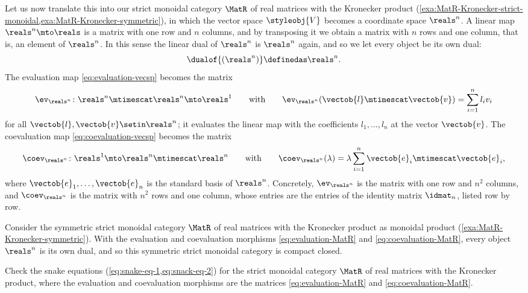 Let us now translate this into our strict monoidal category $\MatR$ of real matrices with the Kronecker product (\cref{exa:MatR-Kronecker-strict-monoidal,exa:MatR-Kronecker-symmetric}), in which the vector space $\styleobj{V}$ becomes a coordinate space $\reals^n$.
A linear map $\reals^n \mto \reals$ is a matrix with one row and $n$ columns, and by transposing it we obtain a matrix with $n$ rows and one column, that is, an element of $\reals^n$.
In this sense the linear dual of $\reals^n$ is $\reals^n$ again, and so we let every object be its own dual:
\begin{equation}
    \dualof{(\reals^n)} \definedas \reals^n.
\end{equation}
The evaluation map \cref{eq:evaluation-vecsp} becomes the matrix
\begin{equation}
    \label{eq:evaluation-MatR}
    \ev_{\reals^n} \colon \reals^n \mtimescat \reals^n \mto \reals^1
    \qquad \text{with} \qquad
    \ev_{\reals^n}(\vectob{l} \mtimescat \vectob{v}) = \sum_{i=1}^n l_i v_i
\end{equation}
for all $\vectob{l}, \vectob{v} \setin \reals^n$; it evaluates the linear map with the coefficients $l_1, \ldots, l_n$ at the vector $\vectob{v}$.
The coevaluation map \cref{eq:coevaluation-vecsp} becomes the matrix
\begin{equation}
    \label{eq:coevaluation-MatR}
    \coev_{\reals^n} \colon \reals^1 \mto \reals^n \mtimescat \reals^n
    \qquad \text{with} \qquad
    \coev_{\reals^n}(\lambda) = \lambda \sum_{i=1}^n \vectob{e}_i \mtimescat \vectob{e}_i,
\end{equation}
where $\vectob{e}_1, \ldots, \vectob{e}_n$ is the standard basis of $\reals^n$.
Concretely, $\ev_{\reals^n}$ is the matrix with one row and $n^2$ columns, and $\coev_{\reals^n}$ is the matrix with $n^2$ rows and one column, whose entries are the entries of the identity matrix $\idmat_n$, listed row by row.

\begin{proposition}
    \label{prop:MatR-Kronecker-compact-closed}
    Consider the symmetric strict monoidal category $\MatR$ of real matrices with the Kronecker product as monoidal product (\cref{exa:MatR-Kronecker-symmetric}).
    With the evaluation and coevaluation morphisms \cref{eq:evaluation-MatR} and \cref{eq:coevaluation-MatR}, every object $\reals^n$ is its own dual, and so this symmetric strict monoidal category is compact closed.
\end{proposition}


\begin{gradedexercise}
    \label{ex:VectSnakeEquations}
    Check the snake equations (\cref{eq:snake-eq-1,eq:snack-eq-2}) for the strict monoidal category $\MatR$ of real matrices with the Kronecker product, where the evaluation and coevaluation morphisms are the matrices \cref{eq:evaluation-MatR} and \cref{eq:coevaluation-MatR}.
\end{gradedexercise}

